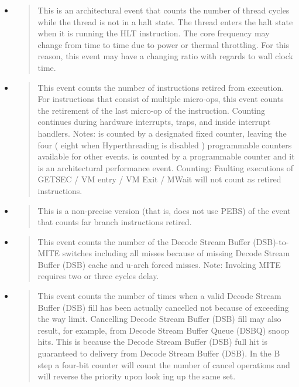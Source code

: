 \begin{itemize}

\item {}
\begin{quotation}
This is an architectural event that counts the number of thread cycles while the
thread is not in a halt state. The thread enters the halt state when it is
running the HLT instruction. The core frequency may change from time to time due
to power or thermal throttling. For this reason, this event may have a changing
ratio with regards to wall clock time.
\end{quotation}

\item {}
\begin{quotation}
This event counts the number of instructions retired from execution. For
instructions that consist of multiple micro-ops, this event counts the
retirement of the last micro-op of the instruction. Counting continues during
hardware interrupts, traps, and inside interrupt handlers. Notes:
 is counted by a designated fixed counter, leaving the
four ( eight when Hyperthreading is disabled ) programmable counters available
for other events.  is counted by a programmable
counter and it is an architectural performance event. Counting: Faulting
executions of GETSEC / VM entry / VM Exit / MWait will not count as retired
instructions.
\end{quotation}

\item {}
\begin{quotation}
This is a non-precise version (that is, does not use PEBS) of the event that
counts far branch instructions retired.
\end{quotation}

\item {}
\begin{quotation}
This event counts the number of the Decode Stream Buffer (DSB)-to-MITE switches
including all misses because of missing Decode Stream Buffer (DSB) cache and
u-arch forced misses. Note: Invoking MITE requires two or three cycles delay.
\end{quotation}

\item {}
\begin{quotation}
This event counts the number of times when a valid Decode Stream Buffer (DSB)
fill has been actually cancelled not because of exceeding the way limit.
Cancelling Decode Stream Buffer (DSB) fill may also result, for example, from
Decode Stream Buffer Queue (DSBQ) snoop hits. This is because the Decode Stream
Buffer (DSB) full hit is guaranteed to delivery from Decode Stream Buffer (DSB).
In the B step a four-bit counter will count the number of cancel operations and
will reverse the priority upon look ing up the same set.
\end{quotation}


\end{itemize}
